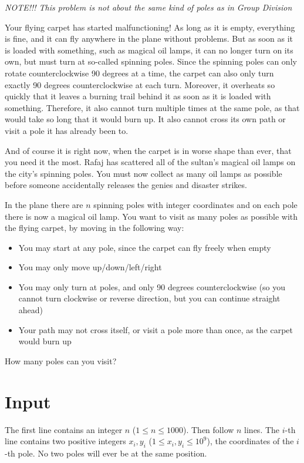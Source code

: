 \textit{NOTE!!! This problem is not about the same kind of poles as in Group Division}

Your flying carpet has started malfunctioning! As long as it is empty, everything is fine, and it can
fly anywhere in the plane without problems. But as soon as it is loaded with something, such as magical oil lamps,
it can no longer turn on its own, but must turn at so-called spinning poles. Since
the spinning poles can only rotate counterclockwise 90 degrees at a time, the carpet can also only turn exactly
90 degrees counterclockwise at each turn. Moreover, it overheats so quickly that it leaves a burning
trail behind it as soon as it is loaded with something. Therefore, it also cannot turn multiple times at
the same pole, as that would take so long that it would burn up. It also cannot cross its own path or
visit a pole it has already been to.

And of course it is right now, when the carpet is in worse shape than ever, that you need it the most.
Rafaj has scattered all of the sultan's magical oil lamps on the city's spinning poles.
You must now collect as many oil lamps as possible before someone accidentally releases the genies and
disaster strikes.

In the plane there are $n$ spinning poles with integer coordinates and on each pole there is now a magical oil lamp.
You want to visit as many poles as possible with the flying carpet, by moving in the following way:
\begin{itemize}
  \item You may start at any pole, since the carpet can fly freely when empty
  \item You may only move up/down/left/right
  \item You may only turn at poles, and only 90 degrees counterclockwise (so you cannot turn clockwise or reverse direction, but you can continue straight ahead)
  \item Your path may not cross itself, or visit a pole more than once, as the carpet would burn up
\end{itemize}
How many poles can you visit?

\section*{Input}
The first line contains an integer $n$ ($1 \leq n \leq 1000$).
Then follow $n$ lines. The $i$-th line contains two positive integers
$x_{i}, y_{i}$ ($1 \leq x_{i}, y_{i} \leq 10^9$), the coordinates of the $i$-th pole.
No two poles will ever be at the same position.


